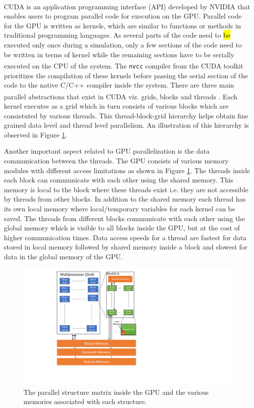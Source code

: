 \documentclass[review]{elsarticle}
\begin{document}
\begin{linenumbers}
CUDA\textsuperscript{\tiny\textregistered} is an application programming interface 
(API) developed by NVIDIA\textsuperscript{\tiny\textregistered} \citep{NVIDIA2012} 
that enables users to program parallel code for execution on the GPU. Parallel code 
for the GPU is written as kernels, which are similar to functions or methods in traditional 
programming languages. As several parts of the code need to \hl{be} executed only once during a 
simulation, only a few sections of the code need to be written in terms of kernel while 
the remaining sections have to be serially executed on the CPU of the system. The \texttt{nvcc} 
compiler from the CUDA\textsuperscript{\tiny\textregistered} toolkit prioritizes the 
compilation of these kernels before passing the serial section of the code to the native 
C/C++ compiler inside the system. There are three main parallel abstractions that exist in 
CUDA\textsuperscript{\tiny\textregistered} viz. grids, blocks and threads \citep{santos2013}. 
Each kernel executes as a grid which in turn consists of various blocks which 
are consistuted by various threads. This thread-block-grid hierarchy helps obtain fine 
grained data level and thread level parallelism. An illustration of this hierarchy is 
observed in Figure \ref{fig:bkg_gpu_arch}.

Another important aspect related to GPU parallelization is the data communication between the threads. 
The GPU consists of various memory modules with different access limitations as shown in Figure 
\ref{fig:bkg_gpu_arch}. The threads inside each block can communicate with each other using the 
shared memory. This memory is local to the block where these threads exist i.e. they are not 
accessible by threads from other blocks. In addition to the shared memory each thread has its 
own local memory where local/temporary variables for each kernel can be saved. 
The threads from different blocks communicate with each other using the global memory which 
is visible to all blocks inside the GPU, but at the cost of higher communication times. 
Data access speeds for a thread are fastest for data stored in local memory followed 
by shared memory inside a block and slowest for data in the global memory of the GPU.


\begin{figure}[H]
\centering
\includegraphics[scale=0.5]{Figure_1.pdf}
\caption{The parallel structure matrix inside the GPU and the various memories associated 
with each structure.}
\label{fig:bkg_gpu_arch}
\end{figure}



\end{linenumbers}
\end{document}
